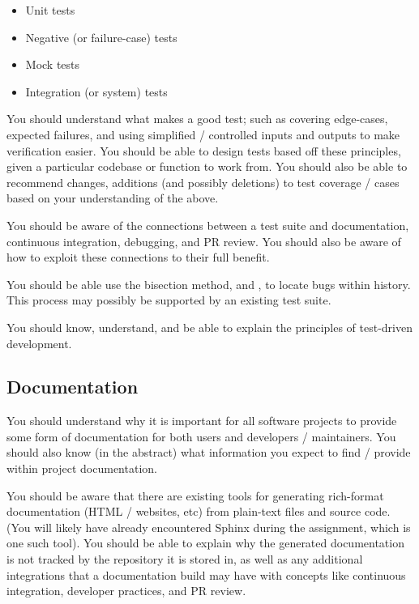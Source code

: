 \begin{itemize}
  \item Unit tests
  \item Negative (or failure-case) tests
  \item Mock tests
  \item Integration (or system) tests
\end{itemize}

You should understand what makes a good test; such as covering edge-cases, expected failures, and using simplified / controlled inputs and outputs to make verification easier.
You should be able to design tests based off these principles, given a particular codebase or function to work from.
You should also be able to recommend changes, additions (and possibly deletions) to test coverage / cases based on your understanding of the above.

You should be aware of the connections between a test suite and documentation, continuous integration, debugging, and PR review.
You should also be aware of how to exploit these connections to their full benefit.

You should be able use the bisection method, and , to locate bugs within history.
This process may possibly be supported by an existing test suite.

You should know, understand, and be able to explain the principles of test-driven development.

\subsection{Documentation}

You should understand why it is important for all software projects to provide some form of documentation for both users and developers / maintainers.
You should also know (in the abstract) what information you expect to find / provide within project documentation.

You should be aware that there are existing tools for generating rich-format documentation (HTML / websites, etc) from plain-text files and source code.
(You will likely have already encountered Sphinx during the assignment, which is one such tool).
You should be able to explain why the generated documentation is not tracked by the repository it is stored in, as well as any additional integrations that a documentation build may have with concepts like continuous integration, developer practices, and PR review.


